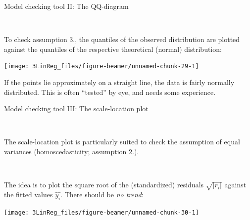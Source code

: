 \documentclass[10pt,ignorenonframetext,]{beamer}
\begin{document}
\begin{frame}

\begin{block}{Model checking tool II: The QQ-diagram}

\(~\)

To check assumption 3., the quantiles of the observed distribution are
plotted against the quantiles of the respective theoretical (normal)
distribution:

\begin{center}\texttt{[image: 3LinReg\_files/figure-beamer/unnamed-chunk-29-1]} \end{center}

If the points lie approximately on a straight line, the data is fairly
normally distributed. This is often ``tested'' by eye, and needs some
experience.

\end{block}

\end{frame}

\begin{frame}

\begin{block}{Model checking tool III: The scale-location plot}

\(~\)

The scale-location plot is particularly suited to check the assumption
of equal variances (homoscedasticity; assumption 2.).

\(~\)

The idea is to plot the square root of the (standardized) residuals
\(\sqrt{|r_i|}\) against the fitted values \(\hat{y_i}\). There should
be \emph{no trend}:

\begin{center}\texttt{[image: 3LinReg\_files/figure-beamer/unnamed-chunk-30-1]} \end{center}

\end{block}

\end{frame}
\end{document}
